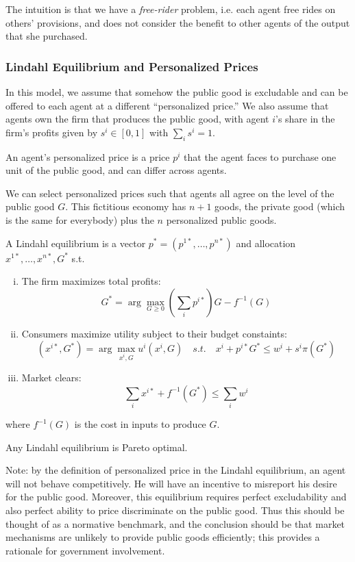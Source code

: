 The intuition is that we have a \textit{free-rider} problem, i.e. each
agent free rides on others' provisions, and does not consider the
benefit to other agents of the output that she purchased.

\subsubsection{Lindahl Equilibrium and Personalized Prices}

In this model, we assume that somehow the public good is excludable
and can be offered to each agent at a different ``personalized
price.'' We also assume that agents own the firm that produces the
public good, with agent $i$'s share in the firm's profits given by
$s^i \in [0,1]$ with $\sum_i s^i = 1$.

\begin{definition}
  An agent's personalized price is a price $p^i$ that the agent faces
  to purchase one unit of the public good, and can differ across
  agents.
\end{definition}

We can select personalized prices such that agents all agree on the
level of the public good $G$. This fictitious economy has $n+1$ goods,
the private good (which is the same for everybody) plus the $n$
personalized public goods.


\begin{definition}
  A Lindahl equilibrium is a vector $p^* = (p^{1*}, \dots, p^{n*})$
  and allocation $x^{1*}, \dots, x^{n*}, G^*$ s.t.
  \begin{enumerate}[(i)]
  \item The firm maximizes total profits:
    \[
    G^* = \arg \max_{G \geq 0} \left(\sum_i p^{i*}\right)G - f^{-1}(G)
    \]
  \item Consumers maximize utility subject to their budget constaints:
    \[
    (x^{i*}, G^*) = \arg \max_{x^i, G} u^i(x^i, G)
    \quad s.t. \quad  x^i + p^{i*}G^* \leq w^i + s^i \pi(G^*) 
    \]
  \item Market clears:
    \[
    \sum_i x^{i*} + f^{-1}(G^*) \leq \sum_i w^i
    \]
  \end{enumerate}
  where $f^{-1}(G)$ is the cost in inputs to produce $G$.

\end{definition}

\begin{prop}
  Any Lindahl equilibrium is Pareto optimal.
\end{prop}

Note: by the definition of personalized price in the Lindahl
equilibrium, an agent will not behave competitively. He will have an
incentive to misreport his desire for the public good. Moreover, this
equilibrium requires perfect excludability and also perfect ability to
price discriminate on the public good. Thus this should be thought of
as a normative benchmark, and the conclusion should be that market
mechanisms are unlikely to provide public goods efficiently; this
provides a rationale for government involvement.
